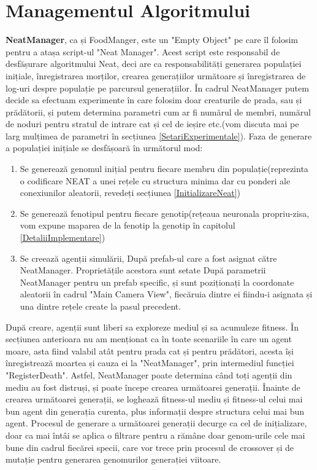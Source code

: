 \section{Managementul Algoritmului}
\textbf{NeatManager}, ca și FoodManger, este un "Empty Object" pe care îl folosim pentru a atașa script-ul "Neat Manager".
Acest script este responsabil de desfășurare algoritmului Neat, deci are ca responsabilități generarea populației inițiale, înregistrarea morților, crearea generațiilor următoare și înregistrarea de log-uri despre populație pe parcursul generațiilor.
În cadrul NeatManager putem decide sa efectuam experimente în care folosim doar creaturile de prada, sau și prădătorii, și putem determina parametri cum ar fi numărul de membri, numărul de noduri pentru stratul de intrare cat și cel de ieșire etc.(vom discuta mai pe larg mulțimea de parametri în secțiunea \ref{SetariExperimentale}). 
Faza de generare a populației inițiale se desfășoară în următorul mod:
\begin{enumerate}
    \item Se generează genomul inițial pentru fiecare membru din populație(reprezinta o codificare NEAT a unei rețele cu structura minima dar cu ponderi ale conexiunilor aleatorii, revedeți secțiunea \ref{InitializareNeat})
    \item Se generează fenotipul pentru fiecare genotip(rețeaua neuronala propriu-zisa, vom expune maparea de la fenotip la genotip în capitolul \ref{DetaliiImplementare})
    \item Se creează agenții simulării, După prefab-ul care a fost asignat către NeatManager. Proprietățile acestora sunt setate După parametrii NeatManager pentru un prefab specific, și sunt poziționați la coordonate aleatorii în cadrul "Main Camera View", fiecăruia dintre ei fiindu-i asignata și una dintre rețele create la pasul precedent.
\end{enumerate}
După creare, agenții sunt liberi sa exploreze mediul și sa acumuleze fitness. În secțiunea anterioara nu am menționat ca în toate scenariile în care un agent moare, asta fiind valabil atât pentru prada cat și pentru prădători, acesta își înregistrează moartea și cauza ei la "NeatManager", prin intermediul funcției "RegisterDeath".
Astfel, NeatManager poate determina când toți agenții din mediu au fost distruși, și poate începe crearea următoarei generații.
Înainte de crearea următoarei generații, se loghează fitness-ul mediu și fitness-ul celui mai bun agent din generația curenta, plus informații despre structura celui mai bun agent.
Procesul de generare a următoarei generații decurge ca cel de inițializare, doar ca mai întâi se aplica o filtrare pentru a rămâne doar genom-urile cele mai bune din cadrul fiecărei specii, care vor trece prin procesul de crossover și de mutație pentru generarea genomurilor generației viitoare.
